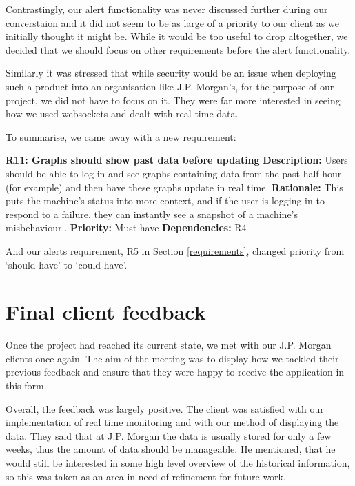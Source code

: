 \documentclass{l3proj}
\begin{document}
Contrastingly, our alert functionality was never discussed further during our converstaion and it did not seem to be as large of a priority to our client as we initially thought it might be. While it would be too useful to drop altogether, we decided that we should focus on other requirements before the alert functionality.

Similarly it was stressed that while security would be an issue when deploying such a product into an organisation like J.P. Morgan's, for the purpose of our project, we did not have to focus on it. They were far more interested in seeing how we used websockets and dealt with real time data.

To summarise, we came away with a new requirement:

\textbf{R11: Graphs should show past data before updating} \newline
\textbf{Description:} Users should be able to log in and see graphs containing data from the past half hour (for example) and then have these graphs update in real time. \newline
\textbf{Rationale:} This puts the machine's status into more context, and if the user is logging in to respond to a failure, they can instantly see a snapshot of a machine's misbehaviour.. \newline
\textbf{Priority:} Must have \newline
\textbf{Dependencies:} R4

And our alerts requirement, R5 in Section \ref{requirements}, changed priority from `should have' to `could have'.

\section{Final client feedback}

Once the project had reached its current state, we  met with our J.P. Morgan clients once again. The aim of the meeting was to display how we tackled their previous feedback and ensure that they were happy to receive the application in this form.

Overall, the feedback was largely positive. The client was satisfied with our implementation of real time monitoring and with our method of displaying the data. They said that at J.P. Morgan the data is usually stored for only a few weeks, thus the amount of data should be manageable. He mentioned, that he would still be interested in some high level overview of the historical information, so this was taken as an area in need of refinement for future work.
\end{document}
